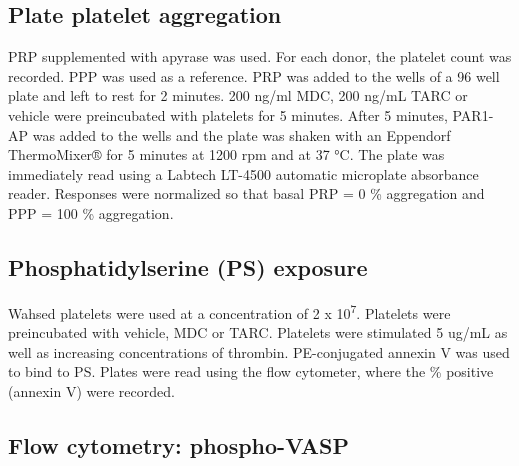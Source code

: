 \documentclass[11pt,twoside]{bristolthesis}
\begin{document}
\hypertarget{plate-platelet-aggregation}{%
\subsection{Plate platelet aggregation}\label{plate-platelet-aggregation}}

PRP supplemented with apyrase was used. For each donor, the platelet count was recorded. PPP was used as a reference. PRP was added to the wells of a 96 well plate and left to rest for 2 minutes. 200 ng/ml MDC, 200 ng/mL TARC or vehicle were preincubated with platelets for 5 minutes. After 5 minutes, PAR1-AP was added to the wells and the plate was shaken with an Eppendorf ThermoMixer® for 5 minutes at 1200 rpm and at 37 °C. The plate was immediately read using a Labtech LT-4500 automatic microplate absorbance reader. Responses were normalized so that basal PRP = 0 \% aggregation and PPP = 100 \% aggregation.

\hypertarget{phosphatidylserine-ps-exposure}{%
\subsection{Phosphatidylserine (PS) exposure}\label{phosphatidylserine-ps-exposure}}

Wahsed platelets were used at a concentration of 2 x 10\textsuperscript{7}. Platelets were preincubated with vehicle, MDC or TARC. Platelets were stimulated 5 ug/mL as well as increasing concentrations of thrombin. PE-conjugated annexin V was used to bind to PS. Plates were read using the flow cytometer, where the \% positive (annexin V) were recorded.

\hypertarget{flow-cytometry-phospho-vasp}{%
\subsection{Flow cytometry: phospho-VASP}\label{flow-cytometry-phospho-vasp}}
\end{document}
